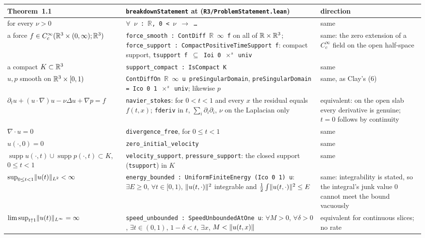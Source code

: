 \documentclass[11pt]{article}
\newcommand{\lean}[1]{\texttt{#1}}
\newcommand{\Lp}[1]{L^{#1}}
\begin{document}
\begin{table}[t]\centering\footnotesize
\begin{tabular}{L{3.4cm}L{8.3cm}L{2.8cm}}\toprule
Theorem~1.1 & \lean{breakdownStatement} at \lean{\UpCommit} (\lean{R3/ProblemStatement.lean}) & direction\\\midrule
for every $\nu>0$ & \lean{$\forall$ $\nu$ : $\mathbb{R}$, 0 < $\nu$ $\to$ \ldots} & same \\
a force $f\in C_c^\infty(\mathbb{R}^3\times(0,\infty);\mathbb{R}^3)$ & \lean{force\_smooth : ContDiff $\mathbb{R}$ $\infty$ f} on all of $\mathbb{R}\times\mathbb{R}^3$; \lean{force\_support : CompactPositiveTimeSupport f}: compact support, \lean{tsupport f $\subseteq$ Ioi 0 $\times^{s}$ univ} & same: the zero extension of a $C_c^\infty$ field on the open half-space \\
a compact $K\subset\mathbb{R}^3$ & \lean{support\_compact : IsCompact K} & same \\
$u,p$ smooth on $\mathbb{R}^3\times[0,1)$ & \lean{ContDiffOn $\mathbb{R}$ $\infty$ u preSingularDomain}, \lean{preSingularDomain = Ico 0 1 $\times^{s}$ univ}; likewise $p$ & same, as Clay's (6) \\
$\partial_tu+(u\cdot\nabla)u-\nu\Delta u+\nabla p=f$ & \lean{navier\_stokes}: for $0<t<1$ and every $x$ the residual equals $f(t,x)$; \lean{fderiv} in $t$, $\sum_i\partial_i\partial_i$, $\nu$ on the Laplacian only & equivalent: on the open slab every derivative is genuine; $t=0$ follows by continuity \\
$\nabla\cdot u=0$ & \lean{divergence\_free}, for $0\le t<1$ & same \\
$u(\cdot,0)=0$ & \lean{zero\_initial\_velocity} & same \\
$\operatorname{supp}u(\cdot,t)\cup\operatorname{supp}p(\cdot,t)\subset K$, $0\le t<1$ & \lean{velocity\_support}, \lean{pressure\_support}: the closed support (\lean{tsupport}) in $K$ & same \\
$\sup_{0\le t<1}\norm{u(t)}_{\Lp2}<\infty$ & \lean{energy\_bounded : UniformFiniteEnergy (Ico 0 1) u}: $\exists E\ge0$, $\forall t\in[0,1)$, $\lVert u(t,\cdot) \rVert^2$ integrable and $\tfrac12\int\lVert u(t,\cdot) \rVert^2\le E$ & same: integrability is stated, so the integral's junk value $0$ cannot meet the bound vacuously \\
$\limsup_{t\uparrow1}\norm{u(t)}_{\Lp\infty}=\infty$ & \lean{speed\_unbounded : SpeedUnboundedAtOne u}: $\forall M>0$, $\forall\delta>0$, $\exists t\in(0,1)$, $1-\delta<t$, $\exists x$, $M<\lVert u(t,x) \rVert$ & equivalent for continuous slices; no rate \\

\end{tabular}
\end{table}
\end{document}
